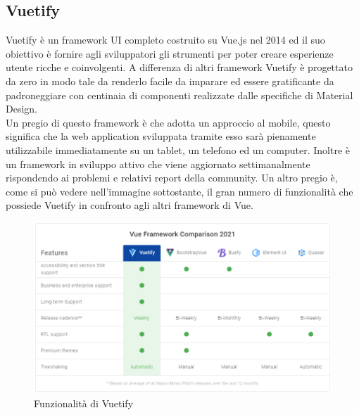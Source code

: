\subsection{Vuetify}
Vuetify è un framework UI completo costruito su Vue.js nel 2014 ed il suo obiettivo è fornire agli sviluppatori gli strumenti per poter creare esperienze utente ricche e coinvolgenti. A differenza di altri framework Vuetify è progettato da zero in modo tale da renderlo facile da imparare ed essere gratificante da padroneggiare con centinaia di componenti realizzate dalle specifiche di Material Design.\\
Un pregio di questo framework è che adotta un approccio al mobile, questo significa che la web application sviluppata tramite esso sarà pienamente utilizzabile immediatamente su un tablet, un telefono ed un computer. Inoltre è un framework in sviluppo attivo che viene aggiornato settimanalmente rispondendo ai problemi e relativi report della community. Un altro pregio è, come si può vedere nell'immagine sottostante, il gran numero di funzionalità che possiede Vuetify in confronto agli altri framework di Vue.
\begin{figure}[H]
	\begin{center}
		\includegraphics[width=1\columnwidth]{immagini/vuetify.png}
		\caption{Funzionalità di Vuetify}
	\end{center}
\end{figure}
